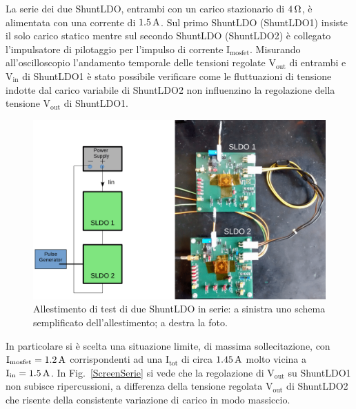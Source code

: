 La serie dei due ShuntLDO, entrambi con un carico stazionario di $4 {\rm \, \Omega}$, è alimentata con una corrente di $1.5\rm \, A$. Sul primo ShuntLDO (ShuntLDO1) insiste il solo carico statico mentre sul secondo ShuntLDO (ShuntLDO2) è collegato l'impulsatore di pilotaggio per l'impulso di corrente $\mathrm{I_{mosfet}}$.
Misurando all'oscilloscopio l'andamento temporale delle tensioni regolate $\mathrm{V_{out}}$ di entrambi e $\mathrm{V_{in}}$ di ShuntLDO1 è stato possibile verificare come le fluttuazioni di tensione indotte dal carico variabile di ShuntLDO2 non influenzino la regolazione della tensione $\mathrm{V_{out}}$ di ShuntLDO1.
\begin{figure}[h!]
\centering
\includegraphics[scale=.30]{Immagini/SLDOserie}
\caption{Allestimento di test di due ShuntLDO in serie: a sinistra uno schema semplificato dell'allestimento; a destra la foto.}
\label{SLDOserie}
\end{figure}
In particolare si \`e scelta una situazione limite, di massima sollecitazione, con $\mathrm{I_{mosfet}} = 1.2 \rm \, A$ corrispondenti ad una $\mathrm{I_{tot}}$ di circa $1.45 \rm \, A$ molto vicina a $\mathrm{I_{in}} = 1.5 \rm \, A$. In Fig.~\ref{ScreenSerie} si vede che la regolazione di $\mathrm{V_{out}}$ su ShuntLDO1 non subisce ripercussioni, a differenza della tensione regolata $\mathrm{V_{out}}$ di ShuntLDO2 che risente della consistente variazione di carico in modo massiccio.
